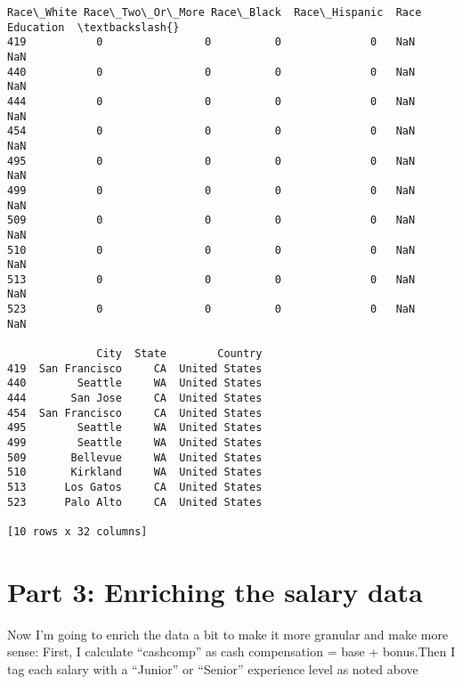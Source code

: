 \documentclass[11pt]{article}
\begin{document}
\begin{Verbatim}[commandchars=\\\{\}]
     Race\_White Race\_Two\_Or\_More Race\_Black  Race\_Hispanic  Race  Education  \textbackslash{}
419           0                0          0              0   NaN        NaN
440           0                0          0              0   NaN        NaN
444           0                0          0              0   NaN        NaN
454           0                0          0              0   NaN        NaN
495           0                0          0              0   NaN        NaN
499           0                0          0              0   NaN        NaN
509           0                0          0              0   NaN        NaN
510           0                0          0              0   NaN        NaN
513           0                0          0              0   NaN        NaN
523           0                0          0              0   NaN        NaN

              City  State        Country
419  San Francisco     CA  United States
440        Seattle     WA  United States
444       San Jose     CA  United States
454  San Francisco     CA  United States
495        Seattle     WA  United States
499        Seattle     WA  United States
509       Bellevue     WA  United States
510       Kirkland     WA  United States
513      Los Gatos     CA  United States
523      Palo Alto     CA  United States

[10 rows x 32 columns]
    \end{Verbatim}

    \hypertarget{part-3-enriching-the-salary-data}{%
\section{Part 3: Enriching the salary
data}\label{part-3-enriching-the-salary-data}}

    Now I'm going to enrich the data a bit to make it more granular and make
more sense: First, I calculate ``cashcomp'' as cash compensation = base
+ bonus.Then I tag each salary with a ``Junior'' or ``Senior''
experience level as noted above
\end{document}
